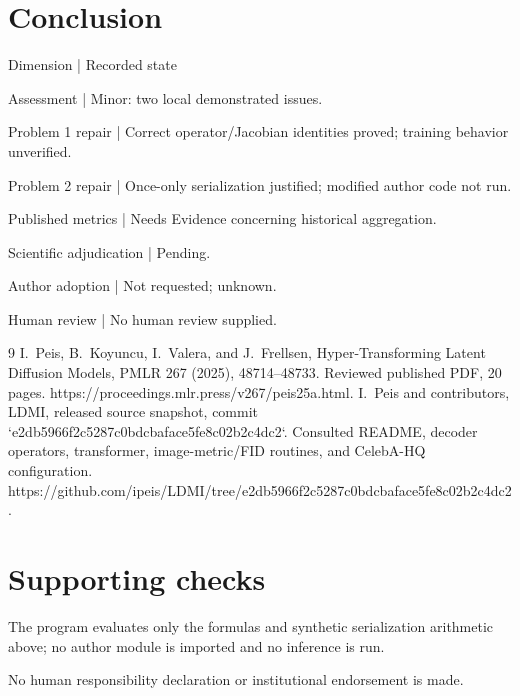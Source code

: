 \documentclass[10pt]{article}
\begin{document}
\section*{Conclusion}
Dimension | Recorded state\par
Assessment | Minor: two local demonstrated issues.\par
Problem 1 repair | Correct operator/Jacobian identities proved; training behavior unverified.\par
Problem 2 repair | Once-only serialization justified; modified author code not run.\par
Published metrics | Needs Evidence concerning historical aggregation.\par
Scientific adjudication | Pending.\par
Author adoption | Not requested; unknown.\par
Human review | No human review supplied.\par
9 I. Peis, B. Koyuncu, I. Valera, and J. Frellsen, Hyper-Transforming Latent Diffusion Models, PMLR 267 (2025), 48714–48733. Reviewed published PDF, 20 pages. https://proceedings.mlr.press/v267/peis25a.html. I. Peis and contributors, LDMI, released source snapshot, commit `e2db5966f2c5287c0bdcbaface5fe8c02b2c4dc2`. Consulted README, decoder operators, transformer, image-metric/FID routines, and CelebA-HQ configuration. https://github.com/ipeis/LDMI/tree/e2db5966f2c5287c0bdcbaface5fe8c02b2c4dc2.\par
\section*{Supporting checks}
The program evaluates only the formulas and synthetic serialization arithmetic above; no author module is imported and no inference is run.\par
No human responsibility declaration or institutional endorsement is made.\par
\end{document}
